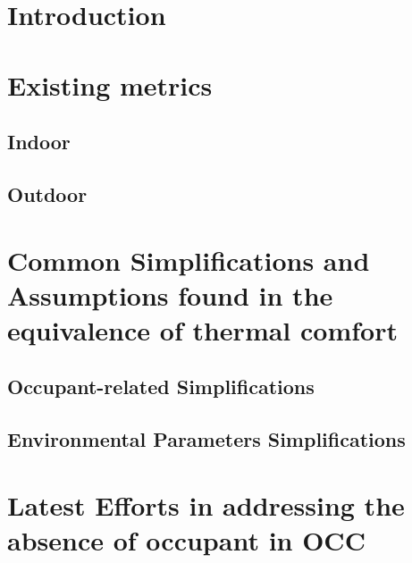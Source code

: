\documentclass[review]{elsarticle}
\begin{document}
\section{Introduction}


\section{Existing metrics}
    \subsection{Indoor}
    
    \subsection{Outdoor} 
    

\section{Common Simplifications and Assumptions found in the equivalence of thermal comfort}
    \subsection{Occupant-related Simplifications}
    
    \subsection{Environmental Parameters Simplifications}
    
%         
%         
\section{Latest Efforts in addressing the absence of occupant in OCC}
\end{document}
